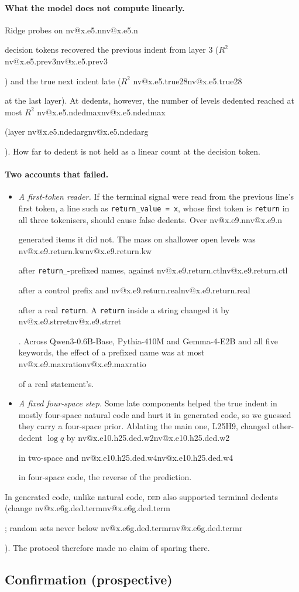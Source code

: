 \documentclass[11pt]{article}
\makeatletter
\newcommand{\nv}[1]{\ifcsname nv@#1\endcsname\csname nv@#1\endcsname\else\PackageError{numbers}{Unknown number key #1}{}\fi}
\newcommand{\qw}{Qwen3-0.6B-Base}
\newcommand{\hd}[2]{L#1H#2}
\newcommand{\ded}{\textsc{ded}}
\newcommand{\code}[1]{\texttt{#1}}
\makeatother
\begin{document}
\paragraph{What the model does not compute linearly.} Ridge probes on \nv{x.e5.n} decision tokens recovered the previous indent from layer 3 ($R^2$ \nv{x.e5.prev3}) and the true next indent late ($R^2$ \nv{x.e5.true28} at the last layer). At dedents, however, the number of levels dedented reached at most $R^2$ \nv{x.e5.ndedmax} (layer \nv{x.e5.ndedarg}). How far to dedent is not held as a linear count at the decision token.

\paragraph{Two accounts that failed.}
\begin{itemize}
\item \emph{A first-token reader.} If the terminal signal were read from the previous line's first token, a line such as \code{return\_value = x}, whose first token is \code{return} in all three tokenisers, should cause false dedents. Over \nv{x.e9.n} generated items it did not. The mass on shallower open levels was \nv{x.e9.return.kw} after \code{return\_}-prefixed names, against \nv{x.e9.return.ctl} after a control prefix and \nv{x.e9.return.real} after a real \code{return}. A \code{return} inside a string changed it by \nv{x.e9.strret}. Across \qw{}, Pythia-410M and Gemma-4-E2B and all five keywords, the effect of a prefixed name was at most \nv{x.e9.maxratio} of a real statement's.
\item \emph{A fixed four-space step.} Some late components helped the true indent in mostly four-space natural code and hurt it in generated code, so we guessed they carry a four-space prior. Ablating the main one, \hd{25}{9}, changed other-dedent $\log q$ by \nv{x.e10.h25.ded.w2} in two-space and \nv{x.e10.h25.ded.w4} in four-space code, the reverse of the prediction.
\end{itemize}
In generated code, unlike natural code, \ded{} also supported terminal dedents (change \nv{x.e6g.ded.term}; random sets never below \nv{x.e6g.ded.termr}). The protocol therefore made no claim of sparing there.

\subsection{Confirmation (prospective)}
\label{sec:conf}
\end{document}
